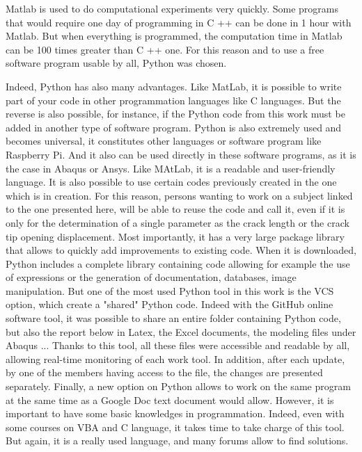 Matlab is used to do computational experiments very quickly. Some programs that would require one day of programming in C ++ can be done in 1 hour with Matlab. But when everything is programmed, the computation time in Matlab can be 100 times greater than  C ++ one. For this reason and to use a free software program usable by all, Python was chosen.

Indeed, Python has also many advantages. Like MatLab, it is possible to write part of your code in other programmation languages like C languages. But the reverse is also possible, for instance, if the Python code from this work must be added in another type of software program.
Python is also extremely used and becomes universal, it constitutes other languages or software program like Raspberry Pi. And it also can be used directly in these software programs, as it is the case in Abaqus or Ansys. Like MAtLab, it is a readable and user-friendly language. It is also possible to use certain codes previously created in the one which is in creation. For this reason, persons wanting to work on a subject linked to the one presented here, will be able to reuse the code and call it, even if it is only for the determination of a single parameter as the crack length or the crack tip opening displacement. Most importantly, it has a very large package library that allows to quickly add improvements to existing code. When it is downloaded, Python includes a complete library containing code allowing for example the use of expressions or the generation of documentation, databases, image manipulation. But one of the most used Python tool in this work is the VCS option, which create a "shared" Python code. Indeed with the GitHub online software tool, it was possible to share an entire folder containing Python code, but also the report below in Latex, the Excel documents, the modeling files under Abaqus ... Thanks to this tool, all these files were accessible and readable by all, allowing real-time monitoring of each work tool. In addition, after each update, by one of the members having access to the file, the changes are presented separately. Finally, a new option on Python allows to work on the same program at the same time as a Google Doc text document would allow. However, it is important to have some basic knowledges in programmation. Indeed, even with some courses on VBA and C language, it takes time to take charge of this tool. But again, it is a really used language, and many forums allow to find solutions.



